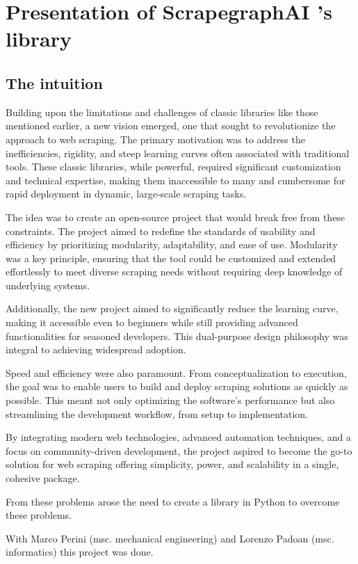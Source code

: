 \clearpage
\section{Presentation of ScrapegraphAI ’s library}
\subsection{The intuition}
Building upon the limitations and challenges of classic libraries like those mentioned earlier, a new vision emerged, one that sought to revolutionize the approach to web scraping. The primary motivation was to address the inefficiencies, rigidity, and steep learning curves often associated with traditional tools. These classic libraries, while powerful, required significant customization and technical expertise, making them inaccessible to many and cumbersome for rapid deployment in dynamic, large-scale scraping tasks.

The idea was to create an open-source project that would break free from these constraints. The project aimed to redefine the standards of usability and efficiency by prioritizing modularity, adaptability, and ease of use. Modularity was a key principle, ensuring that the tool could be customized and extended effortlessly to meet diverse scraping needs without requiring deep knowledge of underlying systems.

Additionally, the new project aimed to significantly reduce the learning curve, making it accessible even to beginners while still providing advanced functionalities for seasoned developers. This dual-purpose design philosophy was integral to achieving widespread adoption.

Speed and efficiency were also paramount. From conceptualization to execution, the goal was to enable users to build and deploy scraping solutions as quickly as possible. This meant not only optimizing the software’s performance but also streamlining the development workflow, from setup to implementation.

By integrating modern web technologies, advanced automation techniques, and a focus on community-driven development, the project aspired to become the go-to solution for web scraping offering simplicity, power, and scalability in a single, cohesive package.

From these problems arose the need to create a library in Python to overcome these problems.

With Marco Perini (msc. mechanical engineering) and Lorenzo Padoan (msc. informatics) this project was done.
